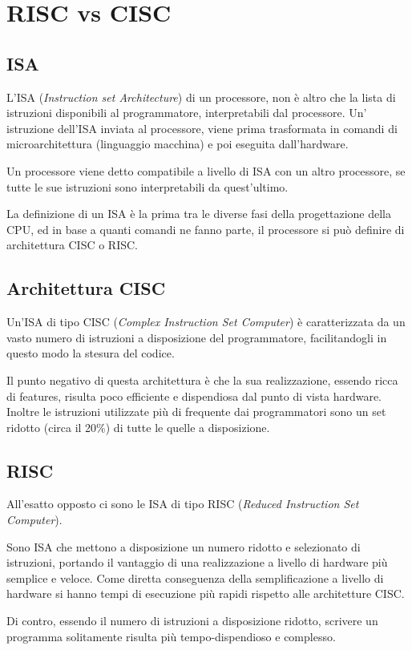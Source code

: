 \documentclass[../ace.tex]{subfiles}
\begin{document}
\section{RISC vs CISC}
\subsection{ISA}
L'ISA (\textit{Instruction set Architecture}) di un processore, non è altro che la lista di istruzioni disponibili
al programmatore, interpretabili dal processore.
Un' istruzione dell'ISA inviata al processore, viene prima trasformata in comandi di microarchitettura
(linguaggio macchina) e poi eseguita dall'hardware.

Un processore viene detto compatibile a livello di ISA con un altro processore, se tutte le sue istruzioni sono interpretabili da quest'ultimo.

La definizione di un ISA è la prima tra le diverse fasi della progettazione della CPU, ed in base a quanti comandi ne fanno parte, il processore si può definire di architettura CISC o RISC.

\subsection{Architettura CISC}
Un'ISA di tipo CISC (\textit{Complex Instruction Set Computer}) è caratterizzata da un vasto numero di istruzioni a disposizione del programmatore, facilitandogli in questo modo la stesura del codice.

Il punto negativo di questa architettura è che la sua realizzazione, essendo ricca di features, risulta poco efficiente e dispendiosa dal punto di vista hardware.
Inoltre le istruzioni utilizzate più di frequente dai programmatori sono un set ridotto (circa il 20\%) di tutte le quelle a disposizione.

\subsection{RISC}
All'esatto opposto ci sono le ISA di tipo RISC (\textit{Reduced Instruction Set Computer}).

Sono ISA che mettono a disposizione un numero ridotto e selezionato di istruzioni, portando il vantaggio di una realizzazione a livello di hardware più semplice e veloce.
Come diretta conseguenza della semplificazione a livello di hardware si hanno tempi di esecuzione più rapidi rispetto alle architetture CISC.

Di contro, essendo il numero di istruzioni a disposizione ridotto, scrivere un programma solitamente risulta più tempo-dispendioso e complesso.
\end{document}
